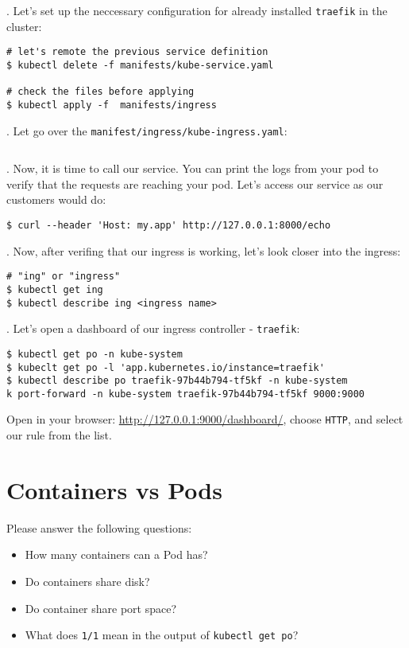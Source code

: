 \documentclass[12pt, letterpaper]{article}
\begin{document}
. Let's set up the neccessary configuration for already installed \verb|traefik| in the cluster:

\begin{verbatim}
# let's remote the previous service definition
$ kubectl delete -f manifests/kube-service.yaml

# check the files before applying
$ kubectl apply -f  manifests/ingress
\end{verbatim}

. Let go over the \verb|manifest/ingress/kube-ingress.yaml|:
\inputminted[breaklines]{yaml}{manifests/ingress/kube-ingress.yaml}


. Now, it is time to call our service. You can print the logs from your pod to verify that the requests are reaching your pod. Let's access our service as our customers would do:

\begin{verbatim}
$ curl --header 'Host: my.app' http://127.0.0.1:8000/echo
\end{verbatim}

. Now, after verifing that our ingress is working, let's look closer into the ingress:

\begin{verbatim}
# "ing" or "ingress"
$ kubectl get ing
$ kubectl describe ing <ingress name>
\end{verbatim}

. Let's open a dashboard of our ingress controller - \verb|traefik|:

\begin{verbatim}
$ kubectl get po -n kube-system
$ kubeclt get po -l 'app.kubernetes.io/instance=traefik'
$ kubectl describe po traefik-97b44b794-tf5kf -n kube-system
k port-forward -n kube-system traefik-97b44b794-tf5kf 9000:9000
\end{verbatim}

Open in your browser: \href{http://127.0.0.1:9000/dashboard/}{http://127.0.0.1:9000/dashboard/}, choose \verb|HTTP|, and select our rule from the list.

\section{Containers vs Pods}

Please answer the following questions:
\begin{itemize}
\item How many containers can a Pod has?
\item Do containers share disk?
\item Do container share port space?
\item What does \verb|1/1| mean in the output of \verb|kubectl get po|?
\end{itemize}
\end{document}
